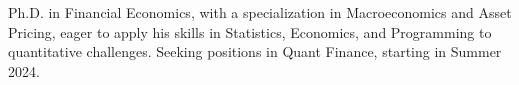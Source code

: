 

\begin{cvparagraph}
	Ph.D. in Financial Economics, with a specialization in Macroeconomics and Asset Pricing, eager to apply his skills in Statistics, Economics, and Programming to quantitative challenges. Seeking positions in Quant Finance, starting in Summer 2024.
\end{cvparagraph}
